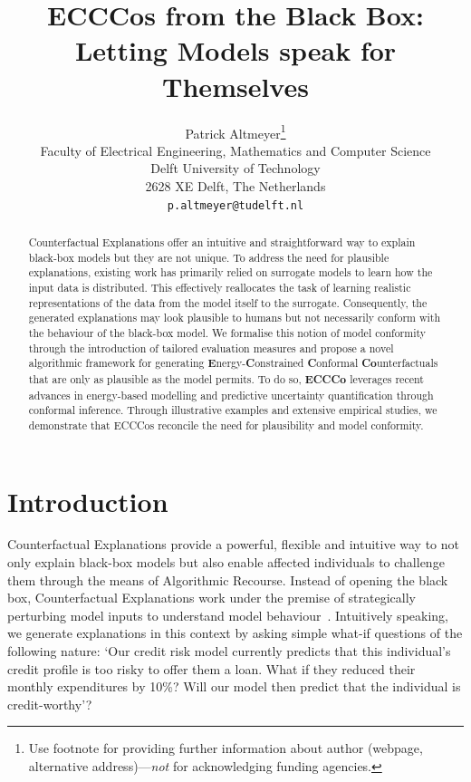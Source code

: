 \documentclass{article}
\title{ECCCos from the Black Box: Letting Models speak for Themselves}
\author{%
  Patrick Altmeyer\thanks{Use footnote for providing further information
    about author (webpage, alternative address)---\emph{not} for acknowledging
    funding agencies.} \\
  Faculty of Electrical Engineering, Mathematics and Computer Science\\
  Delft University of Technology\\
  2628 XE Delft, The Netherlands \\
  \texttt{p.altmeyer@tudelft.nl} \\
}
\begin{document}
\maketitle


\begin{abstract}
  Counterfactual Explanations offer an intuitive and straightforward way to explain black-box models but they are not unique. To address the need for plausible explanations, existing work has primarily relied on surrogate models to learn how the input data is distributed. This effectively reallocates the task of learning realistic representations of the data from the model itself to the surrogate. Consequently, the generated explanations may look plausible to humans but not necessarily conform with the behaviour of the black-box model. We formalise this notion of model conformity through the introduction of tailored evaluation measures and propose a novel algorithmic framework for generating \textbf{E}nergy-\textbf{C}onstrained \textbf{C}onformal \textbf{Co}unterfactuals that are only as plausible as the model permits. To do so, \textbf{ECCCo} leverages recent advances in energy-based modelling and predictive uncertainty quantification through conformal inference. Through illustrative examples and extensive empirical studies, we demonstrate that ECCCos reconcile the need for plausibility and model conformity. 
\end{abstract}

\section{Introduction}\label{intro}

Counterfactual Explanations provide a powerful, flexible and intuitive way to not only explain black-box models but also enable affected individuals to challenge them through the means of Algorithmic Recourse. Instead of opening the black box, Counterfactual Explanations work under the premise of strategically perturbing model inputs to understand model behaviour~\citep{wachter2017counterfactual}. Intuitively speaking, we generate explanations in this context by asking simple what-if questions of the following nature: `Our credit risk model currently predicts that this individual's credit profile is too risky to offer them a loan. What if they reduced their monthly expenditures by 10\%? Will our model then predict that the individual is credit-worthy'? 
\end{document}
